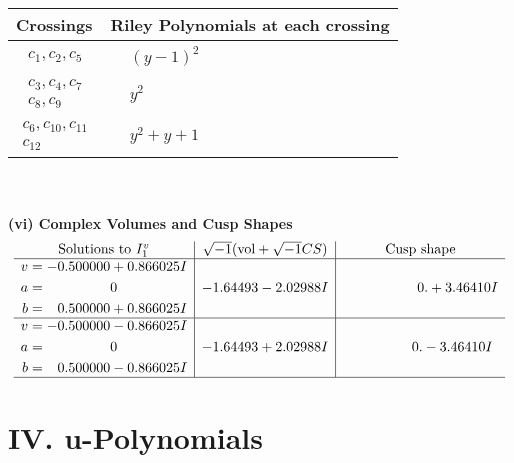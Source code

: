 \documentclass[1p]{elsarticle_modified}
\theoremstyle{definition}
\newcommand{\I}{\sqrt{-1}}
\begin{document}
\begin{tabular}{m{50pt}|m{274pt}}
Crossings & \hspace{64pt}Riley Polynomials at each crossing \\
\hline $$\begin{aligned}c_{1},c_{2},c_{5}\end{aligned}$$&$\begin{aligned}
&(y-1)^2
\end{aligned}$\\
\hline $$\begin{aligned}c_{3},c_{4},c_{7}\\c_{8},c_{9}\end{aligned}$$&$\begin{aligned}
&y^2
\end{aligned}$\\
\hline $$\begin{aligned}c_{6},c_{10},c_{11}\\c_{12}\end{aligned}$$&$\begin{aligned}
&y^2+y+1
\end{aligned}$\\
\hline
\end{tabular}\\~\\
\newpage\flushleft \textbf{(vi) Complex Volumes and Cusp Shapes}
$$\begin{array}{c|c|c}  
\text{Solutions to }I^v_{1}& \I (\text{vol} + \sqrt{-1}CS) & \text{Cusp shape}\\
 \hline 
\begin{aligned}
v &= -0.500000 + 0.866025 I \\
a &= \phantom{-0.000000 } 0 \\
b &= \phantom{-}0.500000 + 0.866025 I\end{aligned}
 & -1.64493 - 2.02988 I & \phantom{-0.000000 -}0. + 3.46410 I \\ \hline\begin{aligned}
v &= -0.500000 - 0.866025 I \\
a &= \phantom{-0.000000 } 0 \\
b &= \phantom{-}0.500000 - 0.866025 I\end{aligned}
 & -1.64493 + 2.02988 I & \phantom{-0.000000 } 0. - 3.46410 I\\
 \hline 
 \end{array}$$\newpage
\newpage\renewcommand{\arraystretch}{1}
\centering \section*{ IV. u-Polynomials}
\end{document}
